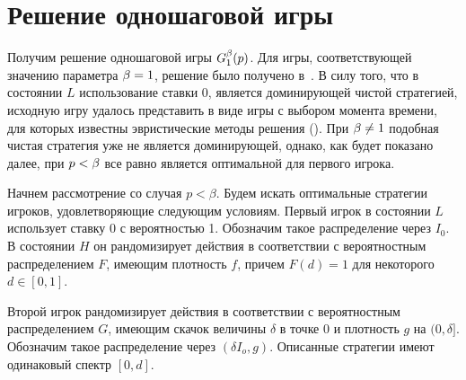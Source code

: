 {\section{Решение одношаговой игры}
\label{ch2:sec:1st}

Получим решение одношаговой игры $G^{\beta}_1(p)$.
Для игры, соответствующей значению параметра $\beta = 1$, решение было получено в~\cite{sandomirskaya12}.
В силу того, что в состоянии $L$ использование ставки $0$, является доминирующей чистой стратегией, исходную игру удалось представить в виде игры с выбором момента времени, для которых известны эвристические методы решения (\seename \cite{karlin64}).
При $\beta \neq 1$ подобная чистая стратегия уже не является доминирующей, однако, как будет показано далее, при $p < \beta$ все равно является оптимальной для первого игрока.

Начнем рассмотрение со случая $p < \beta$.
Будем искать оптимальные стратегии игроков, удовлетворяющие следующим условиям.
Первый игрок в состоянии $L$ использует ставку $0$ с вероятностью 1.
Обозначим такое распределение через $I_0$.
В состоянии $H$ он рандомизирует действия в соответствии с вероятностным распределением $F$, имеющим плотность $f$, причем $F(d) = 1$ для некоторого $d \in [0, 1]$.

Второй игрок рандомизирует действия в соответствии с вероятностным распределением $G$, имеющим скачок величины $\delta$ в точке $0$ и плотность $g$ на $(0, \delta]$.
Обозначим такое распределение через $(\delta I_o, g)$.
Описанные стратегии имеют одинаковый спектр $[0, d]$.

}
